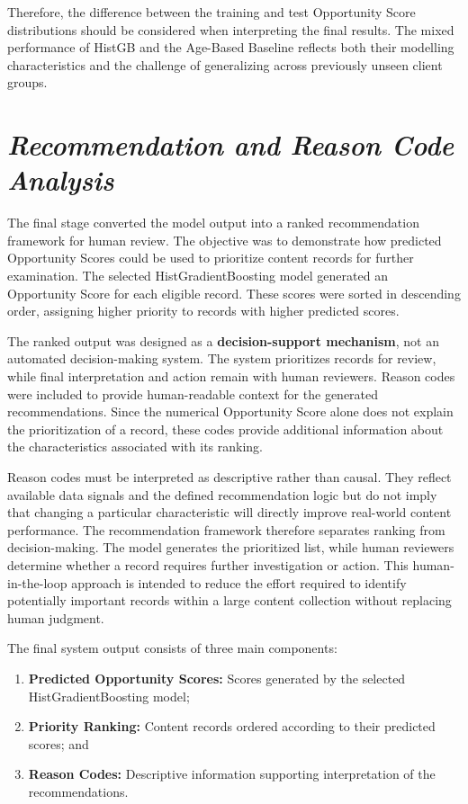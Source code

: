 \documentclass[12pt,a4paper]{report}
\begin{document}
Therefore, the difference between the training and test Opportunity Score distributions should be considered when interpreting the final results. The mixed performance of HistGB and the Age-Based Baseline reflects both their modelling characteristics and the challenge of generalizing across previously unseen client groups.

\section{\textit{Recommendation and Reason Code Analysis}}
The final stage converted the model output into a ranked recommendation framework for human review. The objective was to demonstrate how predicted Opportunity Scores could be used to prioritize content records for further examination. The selected HistGradientBoosting model generated an Opportunity Score for each eligible record. These scores were sorted in descending order, assigning higher priority to records with higher predicted scores.

The ranked output was designed as a \textbf{decision-support mechanism}, not an automated decision-making system. The system prioritizes records for review, while final interpretation and action remain with human reviewers. Reason codes were included to provide human-readable context for the generated recommendations. Since the numerical Opportunity Score alone does not explain the prioritization of a record, these codes provide additional information about the characteristics associated with its ranking.

Reason codes must be interpreted as descriptive rather than causal. They reflect available data signals and the defined recommendation logic but do not imply that changing a particular characteristic will directly improve real-world content performance. The recommendation framework therefore separates ranking from decision-making. The model generates the prioritized list, while human reviewers determine whether a record requires further investigation or action. This human-in-the-loop approach is intended to reduce the effort required to identify potentially important records within a large content collection without replacing human judgment.

The final system output consists of three main components:

\begin{enumerate}
    \item \textbf{Predicted Opportunity Scores:} Scores generated by the selected HistGradientBoosting model;

    \item \textbf{Priority Ranking:} Content records ordered according to their predicted scores; and

    \item \textbf{Reason Codes:} Descriptive information supporting interpretation of the recommendations.
\end{enumerate}
\end{document}

